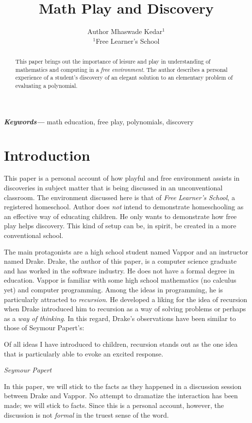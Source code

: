 \documentclass[a4paper]{article}
\title{Math Play and Discovery}
\author{Author Mhaswade Kedar$^{1}$ \\
        \small $^{1}$Free Learner's School\\
}
\date{} %
\providecommand{\keywords}[1]
{
  \small
  \textbf{\textit{Keywords---}} #1
}
\begin{document}
\maketitle

\begin{abstract}
    This paper brings out the importance of leisure and play in understanding of mathematics and computing in a \emph{free environment}. The author describes a personal experience of a student's discovery of an elegant solution to an elementary problem of evaluating a polynomial.
\end{abstract} \hspace{10pt}

\keywords{math education, free play, polynomials, discovery}
\section{Introduction}
\label{sec: intro}
This paper is a personal account of how playful and free environment assists in discoveries in subject matter that is being discussed in an unconventional classroom. The environment discussed here is that of \emph{Free Learner's School}, a registered homeschool. Author does \emph{not} intend to demonstrate homeschooling as an effective way of educating children. He only wants to demonstrate how free play helps discovery. This kind of setup can be, in spirit, be created in a more conventional school.

The main protagonists are a high school student named Vappor and an instructor named Drake. Drake, the author of this paper, is a computer science graduate and has worked in the software industry. He does not have a formal degree in education. Vappor is familiar with some high school mathematics (no calculus yet) and computer programming. Among the ideas in programming, he is particularly attracted to \emph{recursion}. He developed a liking for the idea of recursion when Drake introduced him to recursion as a way of solving problems or perhaps as a \emph{way of thinking}. In this regard, Drake's observations have been similar to those of Seymour Papert's\cite{papert}:
\renewcommand{\epigraphsize}{\small}
\setlength{\epigraphwidth}{0.9\textwidth}
\epigraph
{
Of all ideas I have introduced to children, recursion stands out as the one idea that is particularly able to evoke an excited response.
}
{\textit{Seymour Papert}}

In this paper, we will stick to the facts as they happened in a discussion session between Drake and Vappor. No attempt to dramatize the interaction has been made; we will stick to facts. Since this is a personal account, however, the discussion is not \emph{formal} in the truest sense of the word.
\end{document}
